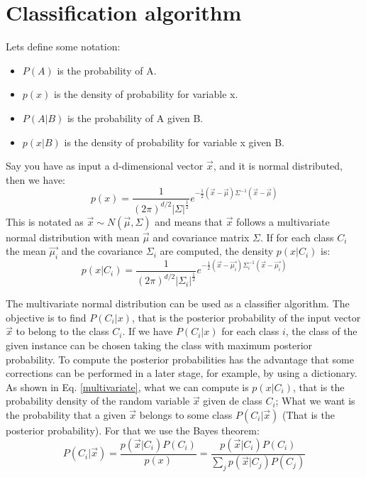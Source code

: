 \documentclass[10pt,journal]{IEEEtran}
\begin{document}
	\section{Classification algorithm}
	Lets define some notation:
	\begin{itemize}
		\item $P(A)$ is the probability of A.
		\item $p(x)$ is the density of probability for variable x.
		\item $P(A|B)$ is the probability of A given B.
		\item $p(x|B)$ is the density of probability for variable x given B.
	\end{itemize}
	Say you have as input a d-dimensional vector $\vec{x}$, and it is normal distributed, then we have:
	\begin{equation}\label{multDens}
		p(x) = \frac{1}{(2\pi)^{d/2}|\Sigma|^\frac{1}{2}} e^{-\frac{1}{2}(\vec{x}-\vec{\mu})\Sigma^{-1}(\vec{x}-\vec{\mu})}
	\end{equation}
	This is notated as $\vec{x} \sim N(\vec{\mu},\Sigma)$ and means that $\vec{x}$ follows a multivariate 
	normal distribution with mean $\vec{\mu}$ and covariance matrix $\Sigma$. If for each class $C_i$ the mean $\vec{\mu_i}$
	and the covariance $\Sigma_i$ are computed, the density $p(x|C_i)$ is:
	\begin{equation}\label{multivariate}
		p(x|C_i) = \frac{1}{(2\pi)^{d/2}|\Sigma_i|^\frac{1}{2}} e^{-\frac{1}{2}(\vec{x}-\vec{\mu_i})\Sigma_i^{-1}(\vec{x}-\vec{\mu_i})}
	\end{equation}
	
	The multivariate normal distribution can be used as a classifier algorithm. The objective is to find $P(C_i|x)$,
	that is the posterior probability of the input vector $\vec{x}$ to belong to the class $C_i$. If we have $P(C_i|x)$
	for each class $i$, the class of the given instance can be chosen taking the class with maximum posterior
	probability. To compute the posterior probabilities has the advantage that some corrections can be performed in
	a later stage, for example, by using a dictionary. \newline
	As shown in Eq. \eqref{multivariate}, what we can compute is $p(x|C_i)$, that is the probability
	density of the random variable $\vec{x}$ given de class $C_i$; What we want is the probability that
	a given $\vec{x}$ belongs to some class $P(C_i|\vec{x})$ (That is the posterior probability). For
	that we use the Bayes theorem:
	\begin{equation}\label{Bayes}
		P(C_i|\vec{x}) = \frac{p(\vec{x}|C_i)P(C_i)}{p(x)} = \frac{p(\vec{x}|C_i)P(C_i)}{ \sum_j{p(\vec{x}|C_j)P(C_j)} }
	\end{equation}
	
\end{document}
